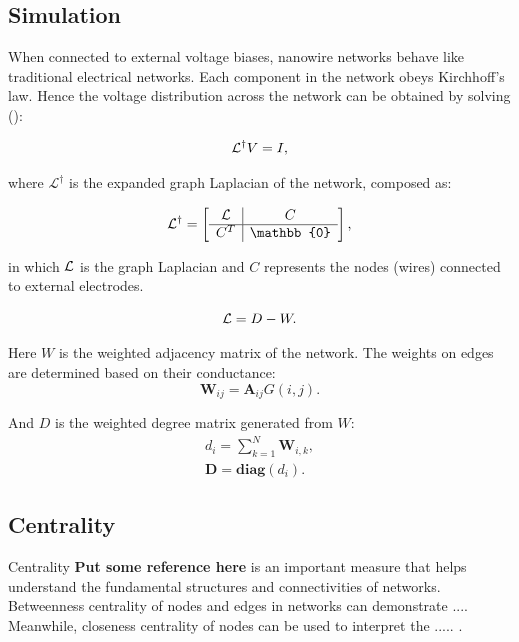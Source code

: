 \documentclass[fleqn,10pt,  amsmath,amssymb,aps]{wlscirep}
\begin{document}
\subsection*{\label{sec:level2} Simulation}
When connected to external voltage biases, nanowire networks behave like traditional electrical networks. Each component in the network obeys Kirchhoff's law. Hence the voltage distribution across the network can be obtained by solving (\cite{Dorfler2018}):

\begin{equation}
{\cal L}^\dagger V = I,
\end{equation}

where $\mathcal{L}^\dagger$ is the expanded graph Laplacian of the network, composed as:

\begin{equation}
	\cal L^\dagger = 
	\left[
	\begin{array}{c|c}
	\cal L&  C\\ 
	\hline
	C^T & \mathbb{0}  
	\end{array}
	\right],
\end{equation}

in which $\cal L$ is the graph Laplacian and $C$ represents the nodes (wires) connected to external electrodes. 

\begin{equation}
{\cal L} = D - W.
\end{equation}

Here $W$ is the weighted adjacency matrix of the network. The weights on edges are determined based on their conductance:
\begin{equation}
	\mathbf W_{ij} = \mathbf A_{ij} G(i,j).
\end{equation}

And $D$ is the weighted degree matrix generated from $W$:
\begin{align}
	d_i = \sum \limits_{k=1}^{N} \mathbf W_{i,k},\\
	\mathbf D = \textbf{diag}(d_i).
\end{align}


\subsection*{Centrality}
Centrality \textbf{Put some reference here} is an important measure that helps understand the fundamental structures and connectivities of networks. Betweenness centrality of nodes and edges in networks can demonstrate .... Meanwhile, closeness centrality of nodes can be used to interpret the ..... \cite{Newman2010}.
\end{document}
